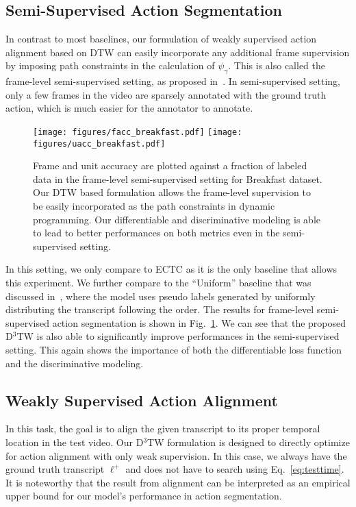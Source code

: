 \documentclass[10pt,twocolumn,letterpaper]{article}
\newcommand{\dttw}{D${}^3$TW\xspace}
\newcommand{\eqnref}[1]{{Eq.\ \eqref{eq:#1}}}
\begin{document}
\subsection{Semi-Supervised Action Segmentation}

In contrast to most baselines, our formulation of weakly supervised action alignment based on DTW can easily incorporate any additional frame supervision by imposing path constraints in the calculation of $\psi_\gamma$. This is also called the frame-level semi-supervised setting, as proposed in~\cite{huang2016connectionist}. In semi-supervised setting, only a few frames in the video are sparsely annotated with the ground truth action, which is much easier for the annotator to annotate.

\begin{figure}[tb]
\centering
\texttt{[image: figures/facc\_breakfast.pdf]}
\texttt{[image: figures/uacc\_breakfast.pdf]}
\vspace{-2mm}
\caption{ Frame and unit accuracy are plotted against a fraction of labeled data in the frame-level semi-supervised setting for Breakfast dataset. Our DTW based formulation allows the frame-level supervision to be easily incorporated as the path constraints in dynamic programming. Our differentiable and discriminative modeling is able to lead to better performances on both metrics even in the semi-supervised setting.
}
\vspace{-3mm}
\label{fig:semi}
\end{figure}

In this setting, we only compare to ECTC as it is the only baseline that allows this experiment. We further compare to the ``Uniform'' baseline that was discussed in~\cite{huang2016connectionist}, where the model uses pseudo labels generated by uniformly distributing the transcript following the order. The results for frame-level semi-supervised action segmentation is shown in  Fig.~\ref{fig:semi}. We can see that the proposed \dttw is also able to  significantly improve performances in the semi-supervised setting. This again shows the importance of both the differentiable loss function and the discriminative modeling.




\subsection{Weakly Supervised Action Alignment}

In this task, the goal is to align the given transcript to its proper temporal location in the test video. Our \dttw formulation is designed to directly optimize for action alignment with only weak supervision. In this case, we always have the ground truth transcript $\ell^+$ and does not have to search using \eqnref{testtime}. It is noteworthy that the result from alignment can be interpreted as an empirical upper bound for our model's performance in action segmentation. 
\end{document}
